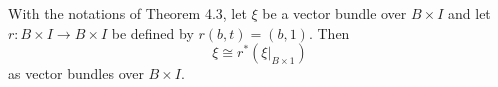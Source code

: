 With the notations of Theorem 4.3, let $\xi$ be a vector bundle over $B \times I$ and let $r: B \times I \to B \times I$ be defined by $r(b, t) = (b, 1)$. Then
$$\xi \cong r^*(\xi|_{B \times 1})$$
as vector bundles over $B \times I$.
